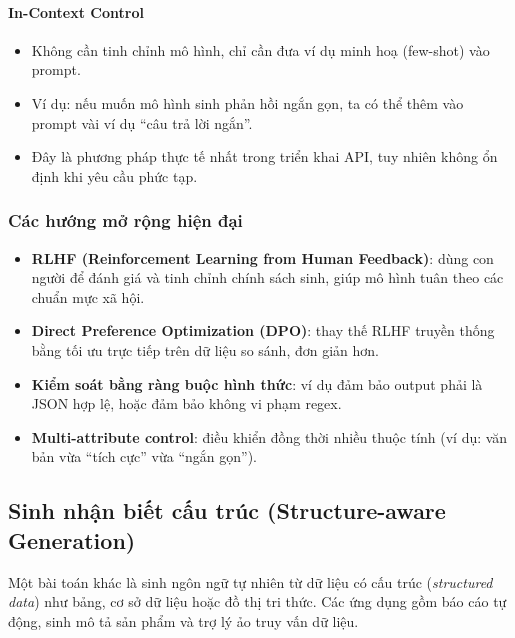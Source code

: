 \paragraph{In-Context Control}
\begin{itemize}
    \item Không cần tinh chỉnh mô hình, chỉ cần đưa ví dụ minh hoạ (few-shot) vào prompt.
    \item Ví dụ: nếu muốn mô hình sinh phản hồi ngắn gọn, ta có thể thêm vào prompt vài ví dụ “câu trả lời ngắn”.
    \item Đây là phương pháp thực tế nhất trong triển khai API, tuy nhiên không ổn định khi yêu cầu phức tạp.
\end{itemize}

\subsubsection{Các hướng mở rộng hiện đại}
\begin{itemize}
    \item \textbf{RLHF (Reinforcement Learning from Human Feedback)}: dùng con người để đánh giá và tinh chỉnh chính sách sinh, giúp mô hình tuân theo các chuẩn mực xã hội.
    \item \textbf{Direct Preference Optimization (DPO)}: thay thế RLHF truyền thống bằng tối ưu trực tiếp trên dữ liệu so sánh, đơn giản hơn.
    \item \textbf{Kiểm soát bằng ràng buộc hình thức}: ví dụ đảm bảo output phải là JSON hợp lệ, hoặc đảm bảo không vi phạm regex.
    \item \textbf{Multi-attribute control}: điều khiển đồng thời nhiều thuộc tính (ví dụ: văn bản vừa “tích cực” vừa “ngắn gọn”).
\end{itemize}

\subsection{Sinh nhận biết cấu trúc (Structure-aware Generation)}
\label{ssec:structure_aware_generation}

Một bài toán khác là sinh ngôn ngữ tự nhiên từ dữ liệu có cấu trúc (\textit{structured data}) như bảng, cơ sở dữ liệu hoặc đồ thị tri thức. Các ứng dụng gồm báo cáo tự động, sinh mô tả sản phẩm và trợ lý ảo truy vấn dữ liệu.

